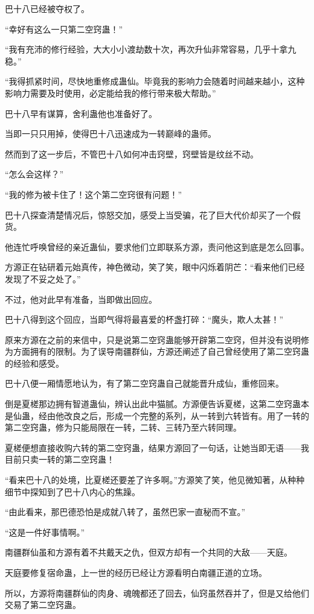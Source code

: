 \begin{this_body}
巴十八已经被夺权了。

“幸好有这么一只第二空窍蛊！”

“我有充沛的修行经验，大大小小渡劫数十次，再次升仙非常容易，几乎十拿九稳。”

“我得抓紧时间，尽快地重修成蛊仙。毕竟我的影响力会随着时间越来越小，这种影响力需要及时使用，必定能给我的修行带来极大帮助。”

巴十八早有谋算，舍利蛊他也准备好了。

当即一只只用掉，使得巴十八迅速成为一转巅峰的蛊师。

然而到了这一步后，不管巴十八如何冲击窍壁，窍壁皆是纹丝不动。

“怎么会这样？”

“我的修为被卡住了！这个第二空窍很有问题！”

巴十八探查清楚情况后，惊怒交加，感受上当受骗，花了巨大代价却买了一个假货。

他连忙呼唤曾经的亲近蛊仙，要求他们立即联系方源，责问他这到底是怎么回事。

方源正在钻研着元始真传，神色微动，笑了笑，眼中闪烁着阴芒：“看来他们已经发现了不妥之处了。”

不过，他对此早有准备，当即做出回应。

巴十八得到这个回应，当即气得将最喜爱的杯盏打碎：“魔头，欺人太甚！”

原来方源在之前的来信中，只是说第二空窍蛊能够开辟第二空窍，但并没有说明修为方面拥有的限制。为了误导南疆群仙，方源还阐述了自己曾经使用了第二空窍蛊的经验和感受。

巴十八便一厢情愿地认为，有了第二空窍蛊自己就能晋升成仙，重修回来。

倒是夏槎那边拥有智道蛊仙，辨认出此中猫腻。方源便告诉夏槎，这第二空窍蛊本是仙蛊，经由他改良之后，形成一个完整的系列，从一转到六转皆有。用了一转的第二空窍蛊，修为只能局限在一转，二转、三转乃至六转同理。

夏槎便想直接收购六转的第二空窍蛊，结果方源回了一句话，让她当即无语——我目前只卖一转的第二空窍蛊！

“看来巴十八的处境，比夏槎还要差了许多啊。”方源笑了笑，他见微知著，从种种细节中探知到了巴十八内心的焦躁。

“由此看来，那巴德恐怕是成就八转了，虽然巴家一直秘而不宣。”

“这是一件好事情啊。”

南疆群仙虽和方源有着不共戴天之仇，但双方却有一个共同的大敌——天庭。

天庭要修复宿命蛊，上一世的经历已经让方源看明白南疆正道的立场。

所以，方源将南疆群仙的肉身、魂魄都还了回去，仙窍虽然吞并了，但是又给他们交易了第二空窍蛊。


\end{this_body}
